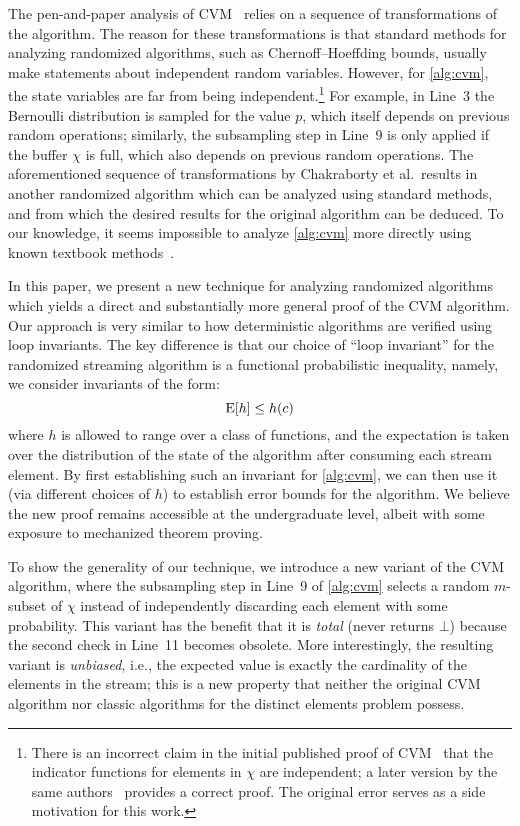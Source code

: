 The pen-and-paper analysis of CVM~\cite{chakraborty2022,chakraborty2023} relies on a sequence of transformations of the algorithm.
The reason for these transformations is that standard methods for analyzing randomized algorithms, such as Chernoff--Hoeffding bounds, usually make statements about independent random variables.
However, for \cref{alg:cvm}, the state variables are far from being independent.\footnote{There is an incorrect claim in the initial published proof of CVM~\cite[Claim 6]{chakraborty2022} that the indicator functions for elements in $\chi$ are independent; a later version by the same authors~\cite{chakraborty2023} provides a correct proof.
The original error serves as a side motivation for this work.}
For example, in Line~3 the Bernoulli distribution is sampled for the value $p$, which itself depends on previous random operations; similarly, the subsampling step in Line~9 is only applied if the buffer $\chi$ is full, which also depends on previous random operations.
The aforementioned sequence of transformations by Chakraborty et al.~results in another randomized algorithm which can be analyzed using standard methods, and from which the desired results for the original algorithm can be deduced.
To our knowledge, it seems impossible to analyze \cref{alg:cvm} more directly using known textbook methods~\cite{alon2000,mitzenmacher2017,motwani1995}.

In this paper, we present a new technique for analyzing randomized algorithms which yields a direct and substantially more general proof of the CVM algorithm.
Our approach is very similar to how deterministic algorithms are verified using loop invariants.
The key difference is that our choice of ``loop invariant'' for the randomized streaming algorithm is a functional probabilistic inequality, namely, we consider invariants of the form:
\[
  \operatorname{\mathrm{E}} [ h ] \leq h(c)
\]
where $h$ is allowed to range over a class of functions, and the expectation is taken over the distribution of the state of the algorithm after consuming each stream element.
By first establishing such an invariant for \cref{alg:cvm}, we can then use it (via different choices of $h$) to establish error bounds for the algorithm.
We believe the new proof remains accessible at the undergraduate level, albeit with some exposure to mechanized theorem proving.

To show the generality of our technique, we introduce a new variant of the CVM algorithm, where the subsampling step in Line~9 of \cref{alg:cvm} selects a random $m$-subset of $\chi$ instead of independently discarding each element with some probability.
This variant has the benefit that it is \emph{total} (never returns $\bot$) because the second check in Line~11 becomes obsolete.
More interestingly, the resulting variant is \emph{unbiased}, i.e., the expected value is exactly the cardinality of the elements in the stream; this is a new property that neither the original CVM algorithm nor classic algorithms for the distinct elements problem possess.

